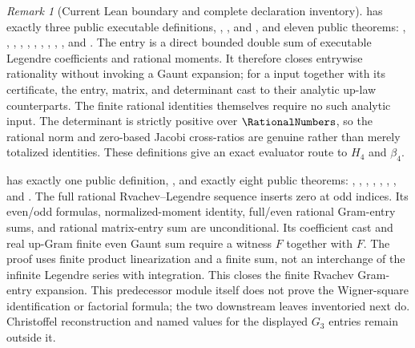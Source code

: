 \documentclass[11pt,oneside]{article}
\theoremstyle{definition}
\theoremstyle{remark}
\newtheorem{remark}[theorem]{Remark}
\numberwithin{equation}{section}
\begin{document}
\begin{remark}[Current Lean boundary and complete declaration inventory]
 has exactly three public executable
definitions, ,
, and , and
eleven public theorems:
,
,
,
,
,
,
,
, ,
, and
.
The entry is a direct bounded double sum of executable Legendre coefficients and rational
moments.  It therefore closes entrywise rationality without invoking a Gaunt expansion;
for a  input together with its  certificate, the entry,
matrix, and determinant cast to their analytic up-law counterparts.  The finite rational
identities themselves require no such analytic input.  The
determinant is strictly positive over \(\RationalNumbers\), so the rational norm and zero-based Jacobi
cross-ratios are genuine rather than merely totalized identities.  These definitions give
an exact evaluator route to \(H_4\) and \(\beta_4\).

 has exactly one public definition,
, and exactly eight public theorems:
,
,
,
,
,
,
, and
.
The full rational Rvachev--Legendre sequence inserts zero at odd indices.  Its
even/odd formulas, normalized-moment identity, full/even rational Gram-entry sums, and
rational matrix-entry sum are unconditional.  Its coefficient cast and real up-Gram
finite even Gaunt sum require a  witness \(F\) together with
 \(F\).  The proof uses finite product linearization and a finite sum, not
an interchange of the infinite Legendre series with integration.  This closes the finite
Rvachev Gram-entry expansion.  This predecessor module itself does not prove the
Wigner-square identification or factorial formula; the two downstream leaves
inventoried next do.  Christoffel reconstruction and named values for the displayed
\(G_3\) entries remain outside it.


\end{remark}
\end{document}
